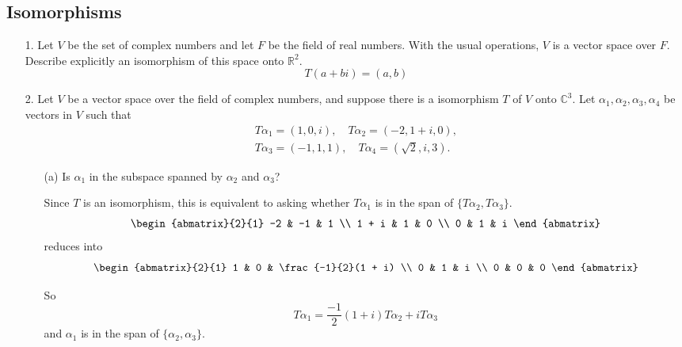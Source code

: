 \documentclass{article}
\begin{document}
\subsection{Isomorphisms}
\begin{enumerate}[listparindent=\parindent]
\item[1.] Let \(V\) be the set of complex numbers and let \(F\) be the field of real numbers.
    With the usual operations, \(V\) is a vector space over \(F\). Describe explicitly an isomorphism of this space onto \(\mathbb{R}^2\).
    \[ T(a + bi) = (a, b) \]

\item[2.] Let \(V\) be a vector space over the field of complex numbers, and suppose there is a isomorphism \(T\) of \(V\) onto \(\mathbb{C}^3\).
    Let \(\alpha_1, \alpha_2, \alpha_3, \alpha_4\) be vectors in \(V\) such that
    \begin{gather*}
        T\alpha_1 = (1, 0, i),\quad T\alpha_2 = (-2, 1 + i, 0), \\
        T\alpha_3 = (-1, 1, 1),\quad T\alpha_4 = (\sqrt{2}, i, 3).
    \end{gather*}
    \begin{enumerate}[listparindent=\parindent]
        \item[(a)] Is \(\alpha_1\) in the subspace spanned by \(\alpha_2\) and \(\alpha_3\)?

            Since \(T\) is an isomorphism, this is equivalent to asking whether \(T\alpha_1\) is in the span of \(\{T\alpha_2, T\alpha_3\}\).
            \[
                \begin{abmatrix}{2}{1}
                    -2 & -1 & 1 \\
                    1 + i & 1 & 0 \\
                    0 & 1 & i
                \end{abmatrix}
            \]
            reduces into
            \[
                \begin{abmatrix}{2}{1}
                    1 & 0 & \frac{-1}{2}(1 + i) \\
                    0 & 1 & i \\
                    0 & 0 & 0
                \end{abmatrix}
            \]

            So
            \[ T\alpha_1 = \frac{-1}{2}(1 + i)T\alpha_2 + iT\alpha_3 \]
            and \(\alpha_1\) is in the span of \(\{\alpha_2, \alpha_3\}\).


\end{enumerate}
\end{enumerate}
\end{document}
